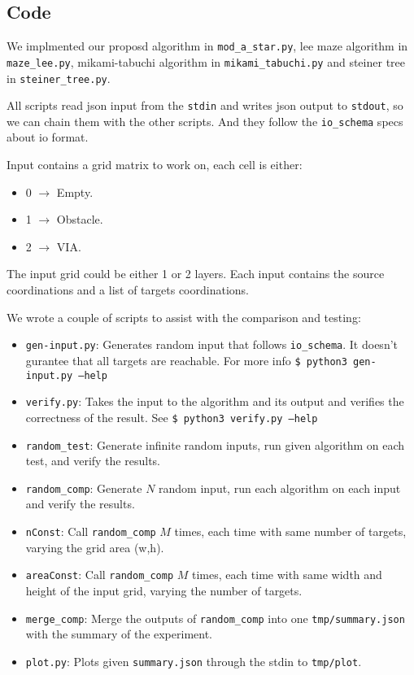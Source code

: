 \subsection{Code}
We implmented our proposd algorithm in \texttt{mod\_a\_star.py}, 
lee maze algorithm in \texttt{maze\_lee.py},
mikami-tabuchi algorithm in \texttt{mikami\_tabuchi.py}
and steiner tree in \texttt{steiner\_tree.py}.

All scripts read json input from the \texttt{stdin} and writes json output to \texttt{stdout}, so we can chain them with the other scripts. And they follow the \texttt{io\_schema} specs about io format.

Input contains a grid matrix to work on, each cell is either:
\begin{itemize}
    \item 0 $\rightarrow$ Empty.
    \item 1 $\rightarrow$ Obstacle.
    \item 2 $\rightarrow$ VIA.
\end{itemize}
The input grid could be either 1 or 2 layers. Each input contains the source coordinations and a list of targets coordinations.

We wrote a couple of scripts to assist with the comparison and testing:
\begin{itemize}
    \item \texttt{gen-input.py}: Generates random input that follows \texttt{io\_schema}. It doesn't gurantee that all targets are reachable. For more info \texttt{\$ python3 gen-input.py --help}
    \item \texttt{verify.py}: Takes the input to the algorithm and its output and verifies the correctness of the result. See \texttt{\$ python3 verify.py --help}
    \item \texttt{random\_test}: Generate infinite random inputs, run given algorithm on each test, and verify the results.
    \item \texttt{random\_comp}: Generate $N$ random input, run each algorithm on each input and verify the results.
    \item \texttt{nConst}: Call \texttt{random\_comp} $M$ times, each time with same number of targets, varying the grid area (w,h).
    \item \texttt{areaConst}: Call \texttt{random\_comp} $M$ times, each time with same width and height of the input grid, varying the number of targets.
    \item \texttt{merge\_comp}: Merge the outputs of \texttt{random\_comp} into one \texttt{tmp/summary.json} with the summary of the experiment.
    \item \texttt{plot.py}: Plots given \texttt{summary.json} through the stdin to \texttt{tmp/plot}.
\end{itemize}